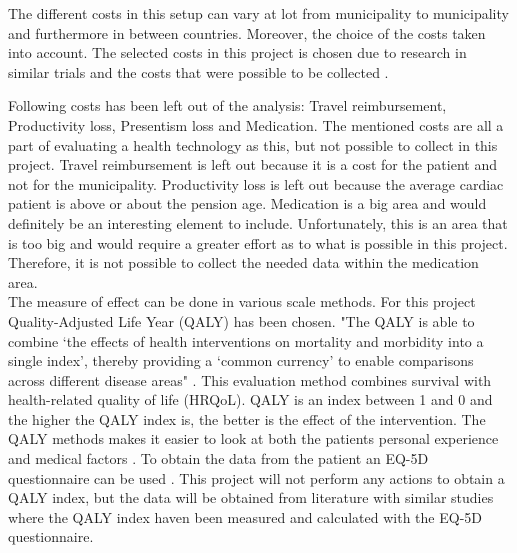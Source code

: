 The different costs in this setup can vary at lot from municipality to municipality and furthermore in between countries. Moreover, the choice of the costs taken into account. The selected costs in this project is chosen due to research in similar trials and the costs that were possible to be collected \cite{costeffect, usingeffect}. 

Following costs has been left out of the analysis: Travel reimbursement, Productivity loss, Presentism loss and Medication. The mentioned costs are all a part of evaluating a health technology as this, but not possible to collect in this project. Travel reimbursement is left out because it is a cost for the patient and not for the municipality. Productivity loss is left out because the average cardiac patient is above or about the pension age. Medication is a big area and would definitely be an interesting element to include. Unfortunately, this is an area that is too big and would require a greater effort as to what is possible in this project. Therefore, it is not possible to collect the needed data within the medication area. \\

The measure of effect can be done in various scale methods. For this project Quality-Adjusted Life Year (QALY) has been chosen. "The QALY is able to combine ‘the effects of health interventions on mortality and morbidity into a single index’, thereby providing a ‘common currency’ to enable comparisons across different disease areas" \cite{QALY}. This evaluation method combines survival with health-related quality of life (HRQoL). QALY is an index between 1 and 0 and the higher the QALY index is, the better is the effect of the intervention. The QALY methods makes it easier to look at both the patients personal experience and medical factors \cite{QALY}. To obtain the data from the patient an EQ-5D questionnaire can be used \cite{costeffect}. This project will not perform any actions to obtain a QALY index, but the data will be obtained from literature with similar studies where the QALY index haven been measured and calculated with the EQ-5D questionnaire.








